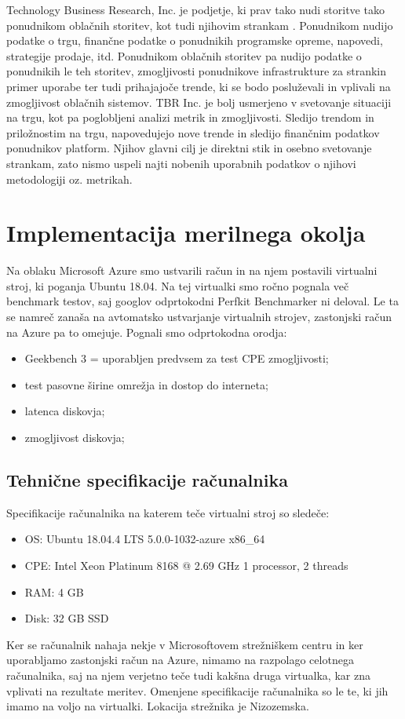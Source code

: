 Technology Business Research, Inc. je podjetje, ki prav tako nudi storitve tako ponudnikom oblačnih storitev, kot tudi njihovim strankam 
\cite{TBR}. Ponudnikom nudijo podatke o trgu, finančne podatke o ponudnikih programske opreme, napovedi, strategije prodaje, itd. Ponudnikom oblačnih storitev pa nudijo podatke o ponudnikih le teh storitev, zmogljivosti ponudnikove infrastrukture za strankin primer uporabe ter tudi prihajajoče trende, ki se bodo posluževali in vplivali na zmogljivost oblačnih sistemov.
TBR Inc. je bolj usmerjeno v svetovanje situaciji na trgu, kot pa poglobljeni analizi metrik in zmogljivosti. Sledijo trendom in priložnostim na trgu, napovedujejo nove trende in sledijo finančnim podatkov ponudnikov platform. Njihov glavni cilj je direktni stik in osebno svetovanje strankam, zato nismo uspeli najti nobenih uporabnih podatkov o njihovi metodologiji oz. metrikah.


\section{Implementacija merilnega okolja}
Na oblaku Microsoft Azure smo ustvarili račun in na njem postavili virtualni stroj, ki poganja Ubuntu 18.04. Na tej virtualki smo ročno pognala več benchmark testov, saj googlov odprtokodni Perfkit Benchmarker ni deloval. Le ta se namreč zanaša na avtomatsko ustvarjanje virtualnih strojev, zastonjski račun na Azure pa to omejuje. Pognali smo odprtokodna orodja:
\begin{itemize}
\item Geekbench 3 = uporabljen predvsem za test CPE zmogljivosti;
\item  test pasovne širine omrežja in dostop do interneta;
\item  latenca diskovja;
\item  zmogljivost diskovja;
\end{itemize}

\subsection{Tehnične specifikacije računalnika}
Specifikacije računalnika na katerem teče virtualni stroj so sledeče:

\begin{itemize}
\item OS: Ubuntu 18.04.4 LTS 5.0.0-1032-azure x86\_64
\item CPE: Intel Xeon Platinum 8168 @ 2.69 GHz 1 processor, 2 threads
\item RAM: 4 GB
\item Disk: 32 GB SSD
\end{itemize}
Ker se računalnik nahaja nekje v Microsoftovem strežniškem centru in ker uporabljamo zastonjski račun na Azure, nimamo na razpolago celotnega računalnika, saj na njem verjetno teče tudi kakšna druga virtualka, kar zna vplivati na rezultate meritev. Omenjene specifikacije računalnika so le te, ki jih imamo na voljo na virtualki. Lokacija strežnika je Nizozemska.


